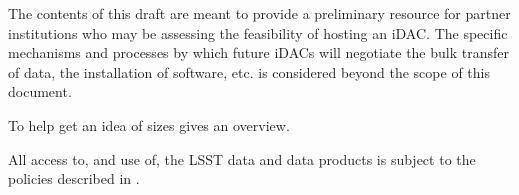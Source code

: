 The contents of this draft are meant to provide a preliminary resource for partner institutions who may be assessing the feasibility of hosting an iDAC. The specific mechanisms and processes by which future iDACs will negotiate the bulk transfer of data, the installation of software, etc. is considered beyond the scope of this document.

To help get an idea of sizes  gives an overview.



All access to, and use of, the LSST data and data products is subject to the policies described in .
